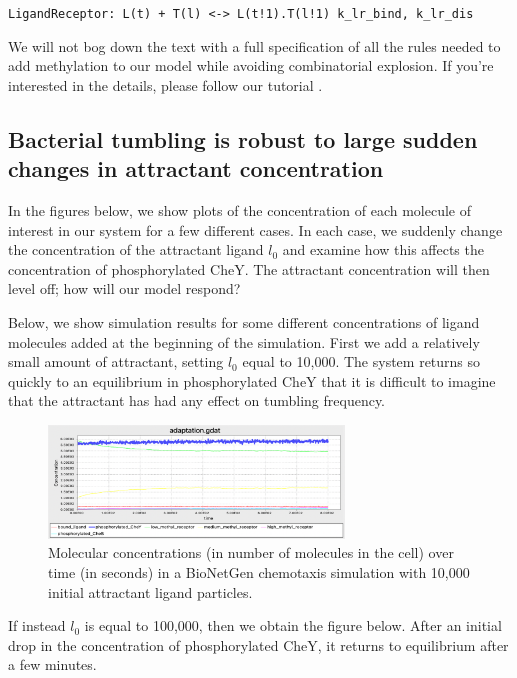 \texttt{LigandReceptor: L(t) + T(l) <-> L(t!1).T(l!1) k\_lr\_bind, k\_lr\_dis}

We will not bog down the text with a full specification of all the rules needed to add methylation to our model while avoiding combinatorial explosion. If you're interested in the details, please follow our tutorial .


\FloatBarrier
{}
\subsection{Bacterial tumbling is robust to large sudden changes in attractant concentration}

In the figures below, we show plots of the concentration of each molecule of interest in our system for a few different cases. In each case, we suddenly change the concentration of the attractant ligand $l_0$ and examine how this affects the concentration of phosphorylated CheY. The attractant concentration will then level off; how will our model respond?

Below, we show simulation results for some different concentrations of ligand molecules added at the beginning of the simulation. First we add a relatively small amount of attractant, setting $l_0$ equal to 10,000. The system returns so quickly to an equilibrium in phosphorylated CheY that it is difficult to imagine that the attractant has had any effect on tumbling frequency.

\begin{figure}[h]
\centering
\mySfFamily
\includegraphics[width = 0.7\textwidth]{../images/chemotaxis_tutorial_oneadd1e4.png}
\caption{Molecular concentrations (in number of molecules in the cell) over time (in seconds) in a BioNetGen chemotaxis simulation with 10,000 initial attractant ligand particles.}
\label{fig:chemotaxis_tutorial_oneadd1e4}
\end{figure}


If instead $l_0$ is equal to 100,000, then we obtain the figure below. After an initial drop in the concentration of phosphorylated CheY, it returns to equilibrium after a few minutes.

